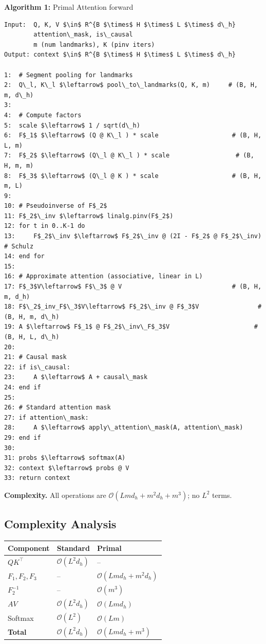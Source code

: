 \textbf{Algorithm 1:} Primal Attention forward
\begin{lstlisting}
Input:  Q, K, V $\in$ R^{B $\times$ H $\times$ L $\times$ d\_h}
        attention\_mask, is\_causal
        m (num landmarks), K (pinv iters)
Output: context $\in$ R^{B $\times$ H $\times$ L $\times$ d\_h}

1:  # Segment pooling for landmarks
2:  Q\_l, K\_l $\leftarrow$ pool\_to\_landmarks(Q, K, m)     # (B, H, m, d\_h)
3:
4:  # Compute factors
5:  scale $\leftarrow$ 1 / sqrt(d\_h)
6:  F$_1$ $\leftarrow$ (Q @ K\_l ) * scale                    # (B, H, L, m)
7:  F$_2$ $\leftarrow$ (Q\_l @ K\_l ) * scale                  # (B, H, m, m)
8:  F$_3$ $\leftarrow$ (Q\_l @ K ) * scale                    # (B, H, m, L)
9:
10: # Pseudoinverse of F$_2$
11: F$_2$\_inv $\leftarrow$ linalg.pinv(F$_2$)
12: for t in 0..K-1 do
13:     F$_2$\_inv $\leftarrow$ F$_2$\_inv @ (2I - F$_2$ @ F$_2$\_inv)   # Schulz
14: end for
15:
16: # Approximate attention (associative, linear in L)
17: F$_3$V\leftarrow$ F$\_3$ @ V                              # (B, H, m, d_h)
18: F$\_2$_inv_F$\_3$V\leftarrow$ F$_2$\_inv @ F$_3$V                # (B, H, m, d\_h)
19: A $\leftarrow$ F$_1$ @ F$_2$\_inv\_F$_3$V                       # (B, H, L, d\_h)
20:
21: # Causal mask
22: if is\_causal:
23:     A $\leftarrow$ A + causal\_mask
24: end if
25:
26: # Standard attention mask
27: if attention\_mask:
28:     A $\leftarrow$ apply\_attention\_mask(A, attention\_mask)
29: end if
30:
31: probs $\leftarrow$ softmax(A)
32: context $\leftarrow$ probs @ V
33: return context
\end{lstlisting}

\textbf{Complexity.} All operations are $\mathcal{O}(L m d_h + m^2 d_h + m^3)$; no 
$L^2$ terms.

\subsection{Complexity Analysis}

\begin{table}[H]
\centering
\small
\begin{tabular}{lll}
\toprule
\textbf{Component} & \textbf{Standard} & \textbf{Primal} \\
\midrule
$Q K^\top$ & $\mathcal{O}(L^2 d_h)$ & -- \\
$F_1, F_2, F_3$ & -- & $\mathcal{O}(L m d_h + m^2 d_h)$ \\
$F_2^{-1}$ & -- & $\mathcal{O}(m^3)$ \\
$A V$ & $\mathcal{O}(L^2 d_h)$ & $\mathcal{O}(L m d_h)$ \\
Softmax & $\mathcal{O}(L^2)$ & $\mathcal{O}(L m)$ \\
\textbf{Total} & $\mathcal{O}(L^2 d_h)$ & $\mathcal{O}(L m d_h + m^3)$ \\
\bottomrule
\end{tabular}
\end{table}


